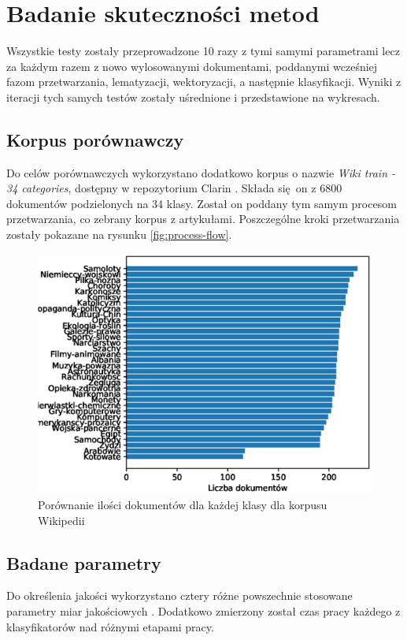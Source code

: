 \chapter{Badanie skuteczności metod}
Wszystkie testy zostały przeprowadzone 10 razy z tymi samymi parametrami lecz za każdym razem z nowo wylosowanymi dokumentami, poddanymi wcześniej fazom przetwarzania, lematyzacji, wektoryzacji, a następnie klasyfikacji. Wyniki z iteracji tych samych testów zostały uśrednione i przedstawione na wykresach. 

\section{Korpus porównawczy}
Do celów porównawczych wykorzystano dodatkowo korpus o nazwie \textit{Wiki train - 34 categories}, dostępny w repozytorium Clarin \cite{11321/222}. Składa się on z 6800 dokumentów podzielonych na 34 klasy. Został on poddany tym samym procesom przetwarzania, co zebrany korpus z artykułami. Poszczególne kroki przetwarzania zostały pokazane na rysunku \ref{fig:process-flow}.

\begin{figure}[ht!]
	\centering
	\includegraphics[width=0.8\linewidth]{img/count-files-wikipedia}
	\caption{Porównanie ilości dokumentów dla każdej klasy dla korpusu Wikipedii}
\end{figure}

\newpage
\section{Badane parametry}

Do określenia jakości wykorzystano cztery różne powszechnie stosowane parametry miar jakościowych \cite{walkowiak2018} \cite{maciej-baj}. Dodatkowo zmierzony został czas pracy każdego z klasyfikatorów nad różnymi etapami pracy.



